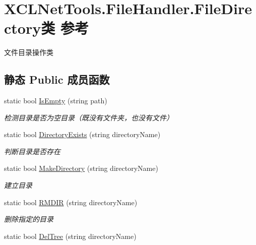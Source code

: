 \hypertarget{class_x_c_l_net_tools_1_1_file_handler_1_1_file_directory}{\section{X\-C\-L\-Net\-Tools.\-File\-Handler.\-File\-Directory类 参考}
\label{class_x_c_l_net_tools_1_1_file_handler_1_1_file_directory}
}


文件目录操作类  


\subsection*{静态 Public 成员函数}
\begin{DoxyCompactItemize}
\item 
static bool \hyperlink{class_x_c_l_net_tools_1_1_file_handler_1_1_file_directory_ac644b5cfdbc06559b2691ca6751506df}{Is\-Empty} (string path)
\begin{DoxyCompactList}\small\item\em 检测目录是否为空目录（既没有文件夹，也没有文件） \end{DoxyCompactList}\item 
static bool \hyperlink{class_x_c_l_net_tools_1_1_file_handler_1_1_file_directory_a1bc5d74fb797d8f8271caf1601f428fe}{Directory\-Exists} (string directory\-Name)
\begin{DoxyCompactList}\small\item\em 判断目录是否存在 \end{DoxyCompactList}\item 
static bool \hyperlink{class_x_c_l_net_tools_1_1_file_handler_1_1_file_directory_a8f3ce048a9225a0b699d7bbc510bd9e3}{Make\-Directory} (string directory\-Name)
\begin{DoxyCompactList}\small\item\em 建立目录 \end{DoxyCompactList}\item 
static bool \hyperlink{class_x_c_l_net_tools_1_1_file_handler_1_1_file_directory_aea79f469e66f1668c6bb4eff61bf9279}{R\-M\-D\-I\-R} (string directory\-Name)
\begin{DoxyCompactList}\small\item\em 删除指定的目录 \end{DoxyCompactList}\item 
static bool \hyperlink{class_x_c_l_net_tools_1_1_file_handler_1_1_file_directory_a1810da560c803121e71fa92fd4f9d180}{Del\-Tree} (string directory\-Name)

\end{DoxyCompactItemize}
